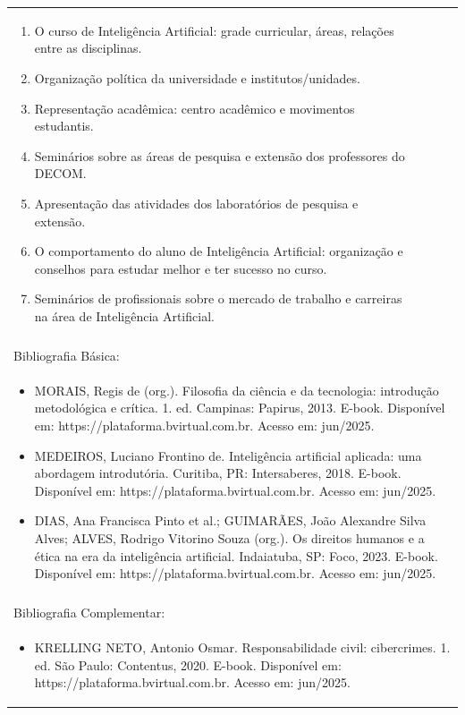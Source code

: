 \documentclass[11pt]{article}
\begin{document}
\begin{center}
\begin{longtable}{|p{4cm}|p{4cm}|p{4cm}|p{4cm}|}
{\begin{enumerate}
\item O curso de Inteligência Artificial: grade curricular, áreas, relações entre as disciplinas.
\item Organização política da universidade e institutos/unidades.
\item Representação acadêmica: centro acadêmico e movimentos estudantis.
\item Seminários sobre as áreas de pesquisa e extensão dos professores do DECOM.
\item Apresentação das atividades dos laboratórios de pesquisa e extensão.
\item O comportamento do aluno de Inteligência Artificial: organização e conselhos para estudar melhor e ter sucesso no curso.
\item Seminários de profissionais sobre o mercado de trabalho e carreiras na área de Inteligência Artificial.\end{enumerate}}\\
\multicolumn{4}{|p{16cm}|}{}\\
\hline
\multicolumn{4}{|p{16cm}|}{Bibliografia Básica:}\\
\multicolumn{4}{|p{\dimexpr 16cm + 6\tabcolsep\relax}|}{%
\begin{itemize}\item MORAIS, Regis de (org.). Filosofia da ciência e da tecnologia: introdução metodológica e crítica. 1. ed. Campinas: Papirus, 2013. E-book. Disponível em: https://plataforma.bvirtual.com.br. Acesso em: jun/2025.
\item MEDEIROS, Luciano Frontino de. Inteligência artificial aplicada: uma abordagem introdutória. Curitiba, PR: Intersaberes, 2018. E-book. Disponível em: https://plataforma.bvirtual.com.br. Acesso em: jun/2025.
\item DIAS, Ana Francisca Pinto et al.; GUIMARÃES, João Alexandre Silva Alves; ALVES, Rodrigo Vitorino Souza (org.). Os direitos humanos e a ética na era da inteligência artificial. Indaiatuba, SP: Foco, 2023. E-book. Disponível em: https://plataforma.bvirtual.com.br. Acesso em: jun/2025.\end{itemize}}\\
\multicolumn{4}{|p{16cm}|}{}\\
\hline
\multicolumn{4}{|p{16cm}|}{Bibliografia Complementar:}\\
\multicolumn{4}{|p{\dimexpr 16cm + 6\tabcolsep\relax}|}{%
\begin{itemize}\item KRELLING NETO, Antonio Osmar. Responsabilidade civil: cibercrimes. 1. ed. São Paulo: Contentus, 2020. E-book. Disponível em: https://plataforma.bvirtual.com.br. Acesso em: jun/2025.

\end{itemize}}
\end{longtable}
\end{center}
\end{document}
